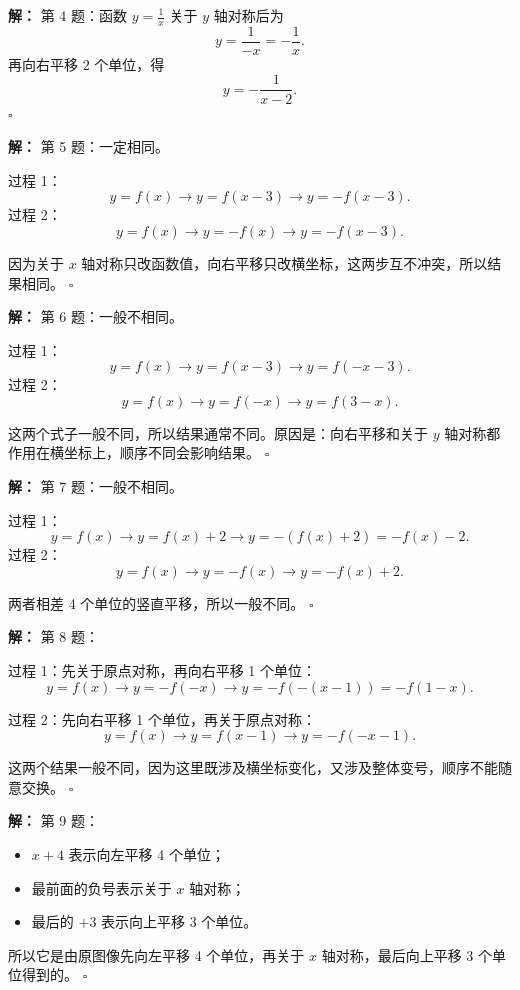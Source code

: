 \documentclass[11pt,a4paper,fontset=fandol]{ctexart}
\theoremstyle{formalexample}
\newenvironment{solution}{\par\noindent\textbf{解：}}{\hfill$\square$\par}
\begin{document}
\begin{solution}
第 4 题：函数 \(y=\frac{1}{x}\) 关于 \(y\) 轴对称后为
\[
y=\frac{1}{-x}=-\frac{1}{x}.
\]
再向右平移 $2$ 个单位，得
\[
\boxed{y=-\frac{1}{x-2}}.
\]
\end{solution}

\begin{solution}
第 5 题：一定相同。

过程 1：
\[
y=f(x) \rightarrow y=f(x-3) \rightarrow y=-f(x-3).
\]
过程 2：
\[
y=f(x) \rightarrow y=-f(x) \rightarrow y=-f(x-3).
\]

因为关于 \(x\) 轴对称只改函数值，向右平移只改横坐标，这两步互不冲突，所以结果相同。
\end{solution}

\begin{solution}
第 6 题：一般不相同。

过程 1：
\[
y=f(x) \rightarrow y=f(x-3) \rightarrow y=f(-x-3).
\]
过程 2：
\[
y=f(x) \rightarrow y=f(-x) \rightarrow y=f(3-x).
\]

这两个式子一般不同，所以结果通常不同。原因是：向右平移和关于 \(y\) 轴对称都作用在横坐标上，顺序不同会影响结果。
\end{solution}

\begin{solution}
第 7 题：一般不相同。

过程 1：
\[
y=f(x) \rightarrow y=f(x)+2 \rightarrow y=-(f(x)+2)=-f(x)-2.
\]
过程 2：
\[
y=f(x) \rightarrow y=-f(x) \rightarrow y=-f(x)+2.
\]

两者相差 4 个单位的竖直平移，所以一般不同。
\end{solution}

\begin{solution}
第 8 题：

过程 1：先关于原点对称，再向右平移 1 个单位：
\[
y=f(x) \rightarrow y=-f(-x) \rightarrow y=-f(-(x-1))=-f(1-x).
\]

过程 2：先向右平移 1 个单位，再关于原点对称：
\[
y=f(x) \rightarrow y=f(x-1) \rightarrow y=-f(-x-1).
\]

这两个结果一般不同，因为这里既涉及横坐标变化，又涉及整体变号，顺序不能随意交换。
\end{solution}

\begin{solution}
第 9 题：
\begin{itemize}
  \item \(x+4\) 表示向左平移 4 个单位；
  \item 最前面的负号表示关于 \(x\) 轴对称；
  \item 最后的 \(+3\) 表示向上平移 3 个单位。
\end{itemize}
所以它是由原图像先向左平移 4 个单位，再关于 \(x\) 轴对称，最后向上平移 3 个单位得到的。
\end{solution}
\end{document}
